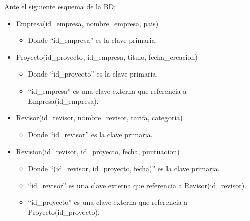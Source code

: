 \documentclass[12pt]{article}
\begin{document}
    Ante el siguiente esquema de la BD:
    \begin{itemize}
        \item Empresa(id\_empresa, nombre\_empresa, pais)
            \begin{itemize}
                \item Donde ``id\_empresa'' es la clave primaria.
            \end{itemize}
        \item Proyecto(id\_proyecto, id\_empresa, titulo, fecha\_creacion)
            \begin{itemize}
                \item Donde ``id\_proyecto'' es la clave primaria.
                \item ``id\_empresa'' es una clave externa que referencia a Empresa(id\_empresa).
            \end{itemize}
        \item Revisor(id\_revisor, nombre\_revisor, tarifa, categoria)
            \begin{itemize}
                \item Donde ``id\_revisor'' es la clave primaria.
            \end{itemize}
        \item Revision(id\_revisor, id\_proyecto, fecha, puntuacion)
            \begin{itemize}
                \item Donde ``(id\_revisor, id\_proyecto, fecha)'' es la clave primaria.
                \item ``id\_revisor'' es una clave externa que referencia a Revisor(id\_revisor).
                \item ``id\_proyecto'' es una clave externa que referencia a Proyecto(id\_proyecto).
            \end{itemize}
    \end{itemize}
\end{document}
